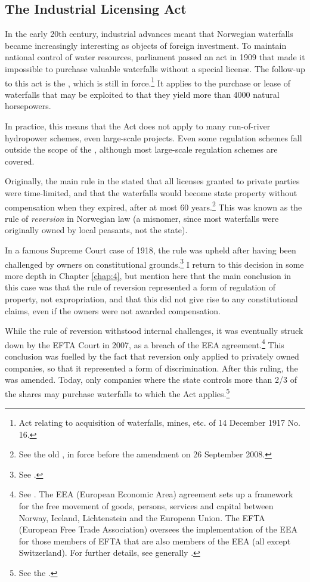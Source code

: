 \subsection{The Industrial Licensing Act}\label{sec:ica17}

In the early 20th century, industrial advances meant that Norwegian waterfalls became increasingly interesting as objects of foreign investment. To maintain national control of water resources, parliament passed an act in 1909 that made it impossible to purchase valuable waterfalls without a special license. The follow-up to this act is the \cite{ica17}, which is still in force.\footnote{Act relating to acquisition of waterfalls, mines, etc. of 14 December 1917 No. 16.} It applies to the purchase or lease of waterfalls that may be exploited to that they yield more than 4000 natural horsepowers.

In practice, this means that the Act does not apply to many run-of-river hydropower schemes, even large-scale projects. Even some regulation schemes fall outside the scope of the \cite{ica17}, although most large-scale regulation schemes are covered.

Originally, the main rule in the \cite{ica17} stated that all licenses granted to private parties were time-limited, and that the waterfalls would become state property without compensation when they expired, after at most 60 years.\footnote{See the old \cite[2]{ica17}, in force before the amendment on 26 September 2008.} This was known as the rule of {\it reversion} in Norwegian law (a misnomer, since most waterfalls were originally owned by local peasants, not the state).

In a famous Supreme Court case of 1918, the rule was upheld after having been challenged by owners on constitutional grounds.\footnote{See \cite{johansen18}.} I return to this decision in some more depth in Chapter \ref{chap:4}, but mention here that the main conclusion in this case was that the rule of reversion represented a form of regulation of property, not expropriation, and that this did not give rise to any constitutional claims, even if the owners were not awarded compensation.

While the rule of reversion withstood internal challenges, it was eventually struck down by the EFTA Court in 2007, as a breach of the EEA agreement.\footnote{See \cite{efta07}. The EEA (European Economic Area) agreement sets up a framework for the free movement of goods, persons, services and capital between Norway, Iceland, Lichtenstein and the European Union. The EFTA (European Free Trade Association) oversees the implementation of the EEA for those members of EFTA that are also members of the EEA (all except Switzerland). For further details, see generally \cite{bull94,magnussen02,fredriksen09}.} This conclusion was fuelled by the fact that reversion only applied to privately owned companies, so that it represented a form of discrimination. After this ruling, the \cite{ica17} was amended. Today, only companies where the state controls more than 2/3 of the shares may purchase waterfalls to which the Act applies.\footnote{See the \cite[2]{ica17}.}

